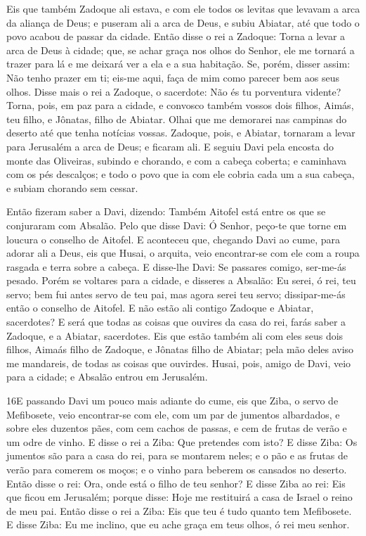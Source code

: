 Eis que também Zadoque ali estava, e com ele todos os levitas que
levavam a arca da aliança de Deus; e puseram ali a arca de Deus, e
subiu Abiatar, até que todo o povo acabou de passar da cidade.
Então disse o rei a Zadoque: Torna a levar a arca de Deus à
cidade; que, se achar graça nos olhos do Senhor, ele me tornará a
trazer para lá e me deixará ver a ela e a sua habitação. Se,
porém, disser assim: Não tenho prazer em ti; eis-me aqui, faça de
mim como parecer bem aos seus olhos. Disse mais o rei a
Zadoque, o sacerdote: Não és tu porventura vidente? Torna, pois, em
paz para a cidade, e convosco também vossos dois filhos, Aimás, teu
filho, e Jônatas, filho de Abiatar. Olhai que me demorarei
nas campinas do deserto até que tenha notícias vossas.
Zadoque, pois, e Abiatar, tornaram a levar para Jerusalém a
arca de Deus; e ficaram ali. E seguiu Davi pela encosta do
monte das Oliveiras, subindo e chorando, e com a cabeça coberta; e
caminhava com os pés descalços; e todo o povo que ia com ele cobria
cada um a sua cabeça, e subiam chorando sem cessar.

Então fizeram saber a Davi, dizendo: Também Aitofel está entre os
que se conjuraram com Absalão. Pelo que disse Davi: Ó Senhor,
peço-te que torne em loucura o conselho de Aitofel. E
aconteceu que, chegando Davi ao cume, para adorar ali a Deus, eis
que Husai, o arquita, veio encontrar-se com ele com a roupa rasgada
e terra sobre a cabeça. E disse-lhe Davi: Se passares comigo,
ser-me-ás pesado. Porém se voltares para a cidade, e disseres
a Absalão: Eu serei, ó rei, teu servo; bem fui antes servo de teu
pai, mas agora serei teu servo; dissipar-me-ás então o conselho de
Aitofel. E não estão ali contigo Zadoque e Abiatar,
sacerdotes? E será que todas as coisas que ouvires da casa do rei,
farás saber a Zadoque, e a Abiatar, sacerdotes. Eis que estão
também ali com eles seus dois filhos, Aimaás filho de Zadoque, e
Jônatas filho de Abiatar; pela mão deles aviso me mandareis, de
todas as coisas que ouvirdes. Husai, pois, amigo de Davi,
veio para a cidade; e Absalão entrou em Jerusalém.

\medskip

\lettrine{16} E passando Davi um pouco mais adiante do cume,
eis que Ziba, o servo de Mefibosete, veio encontrar-se com ele, com
um par de jumentos albardados, e sobre eles duzentos pães, com cem
cachos de passas, e cem de frutas de verão e um odre de vinho. E
disse o rei a Ziba: Que pretendes com isto? E disse Ziba: Os
jumentos são para a casa do rei, para se montarem neles; e o pão e
as frutas de verão para comerem os moços; e o vinho para beberem os
cansados no deserto. Então disse o rei: Ora, onde está o filho
de teu senhor? E disse Ziba ao rei: Eis que ficou em Jerusalém;
porque disse: Hoje me restituirá a casa de Israel o reino de meu
pai. Então disse o rei a Ziba: Eis que teu é tudo quanto tem
Mefibosete. E disse Ziba: Eu me inclino, que eu ache graça em teus
olhos, ó rei meu senhor.

